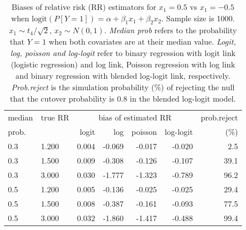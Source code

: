 \documentclass[12pt,a4paper]{article}
\begin{document}
\begin{table}[H] 
\small\sf\centering 
\caption{Biases of relative risk (RR) estimators for $x_1=0.5$ vs $x_1=-0.5$ when $\mbox{logit}(P[Y=1])=\alpha+\beta_1 x_1 + \beta_2 x_2$. Sample size is 1000. $x_1 \sim $$t_4/\sqrt{2}$, $x_2 \sim N(0,1)$. {\it Median prob} refers to the probability that $Y=1$ when both covariates are at their median value. {\it Logit, log, poisson and log-logit} refer to binary regression with logit link (logistic regression) and log link, Poisson regression with log link and binary regression with blended log-logit link, respectively. {\it Prob.reject} is the simulation probability (\%) of rejecting the null that the cutover probability is $0.8$ in the blended log-logit model.} 
\begin{tabular}{llrrrrr} 
\toprule 
median & true RR & \multicolumn{4}{c}{bias of estimated RR} & prob.reject \\ 
prob. & & logit & log & poisson & log-logit  & (\%) \\ \midrule 
0.3 & 1.200 & 0.004 & -0.069 & -0.017 & -0.020 &  2.5 \\  
0.3 & 1.500 & 0.009 & -0.308 & -0.126 & -0.107 & 39.1 \\  
0.3 & 3.000 & 0.030 & -1.777 & -1.323 & -0.789 & 96.2 \\  
0.5 & 1.200 & 0.005 & -0.136 & -0.025 & -0.025 & 29.4 \\  
0.5 & 1.500 & 0.008 & -0.387 & -0.161 & -0.093 & 77.5 \\  
0.5 & 3.000 & 0.032 & -1.860 & -1.417 & -0.488 & 99.4 \\  
\bottomrule 
\end{tabular} 
\end{table} 
\end{document}
